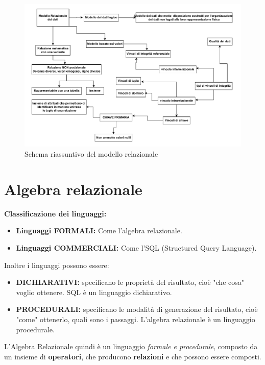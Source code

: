 \documentclass{article}
\begin{document}
\newpage
\begin{figure}[h!]
    \centering
    \includegraphics[width=1\linewidth]{SchemaBD1.pdf}
    \caption{Schema riassuntivo del modello relazionale}
\end{figure}

\newpage
\section{Algebra relazionale}
\textbf{Classificazione dei linguaggi:} \begin{itemize}
    \item \textbf{Linguaggi FORMALI:} Come l'algebra relazionale.
    \item \textbf{Linguaggi COMMERCIALI:} Come l'SQL (Structured Query Language).
\end{itemize}
Inoltre i linguaggi possono essere: \begin{itemize}
    \item \textbf{DICHIARATIVI: }specificano le proprietà del risultato, cioè "che cosa" voglio ottenere. SQL è un linguaggio dichiarativo.
    \item \textbf{PROCEDURALI: }specificano le modalità di generazione del risultato, cioè "come" ottenerlo, quali sono i passaggi. L'algebra relazionale è un linguaggio procedurale.
\end{itemize}

L'Algebra Relazionale quindi è un linguaggio \textit{formale e procedurale}, composto da un insieme di \textbf{operatori}, che producono \textbf{relazioni} e che possono essere composti.
\end{document}
